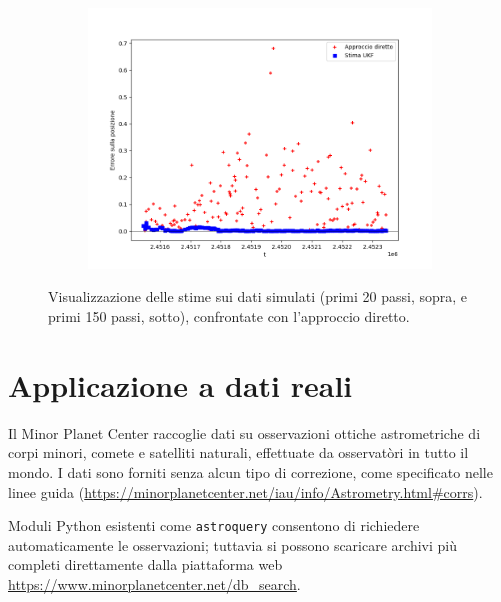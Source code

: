 \documentclass[12pt,a4paper,openright,twoside]{book}
\begin{document}
\begin{figure}
\begin{subfigure}[b]{\linewidth}
\begin{subfigure}[b]{0.45\linewidth}
        \end{subfigure}
    \end{subfigure}
    \bigskip
    \begin{subfigure}[b]{\linewidth}
        \centering
        \includegraphics[width=0.7\linewidth]{figures/simulation_150_error.png}
    \end{subfigure}
    \caption{Visualizzazione delle stime sui dati simulati (primi 20 passi, sopra, e primi 150 passi, sotto), confrontate con l'approccio diretto.}
    \label{fig:sim20+150}
\end{figure}

\pagebreak

\section{Applicazione a dati reali}

Il Minor Planet Center raccoglie dati su osservazioni ottiche astrometriche di corpi minori, comete e satelliti naturali, effettuate da osservatòri in tutto il mondo. I dati sono forniti senza alcun tipo di correzione, come specificato nelle linee guida (\url{https://minorplanetcenter.net/iau/info/Astrometry.html#corrs}).

Moduli Python esistenti come \lstinline{astroquery} consentono di richiedere automaticamente le osservazioni; tuttavia si possono scaricare archivi più completi direttamente dalla piattaforma web \url{https://www.minorplanetcenter.net/db_search}.
\end{document}
